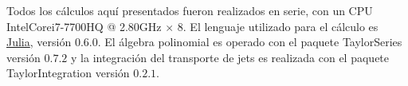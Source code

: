 Todos los cálculos aquí presentados fueron realizados en serie, con un CPU Intel\textregistered  Core\texttrademark  i7-7700HQ @ 2.80GHz $\times$ 8. El lenguaje utilizado para el cálculo es \href{julialang.org}{\textsf{Julia}}, versión $0.6.0$. El álgebra polinomial es operado con el paquete \textsf{TaylorSeries} \cite{TaylorIntegration} versión $0.7.2$ y la integración del transporte de jets es realizada con el paquete \textsf{TaylorIntegration} \cite{TaylorIntegration} versión $0.2.1$.